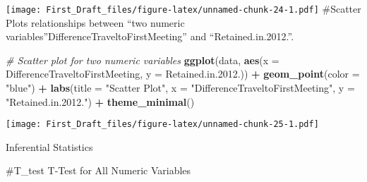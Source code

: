 \documentclass[
]{article}
\newenvironment{Shaded}{\begin{snugshade}}{\end{snugshade}}
\newcommand{\AttributeTok}[1]{\textcolor[rgb]{0.13,0.29,0.53}{#1}}
\newcommand{\CommentTok}[1]{\textcolor[rgb]{0.56,0.35,0.01}{\textit{#1}}}
\newcommand{\FloatTok}[1]{\textcolor[rgb]{0.00,0.00,0.81}{#1}}
\newcommand{\FunctionTok}[1]{\textcolor[rgb]{0.13,0.29,0.53}{\textbf{#1}}}
\newcommand{\NormalTok}[1]{#1}
\newcommand{\SpecialCharTok}[1]{\textcolor[rgb]{0.81,0.36,0.00}{\textbf{#1}}}
\newcommand{\StringTok}[1]{\textcolor[rgb]{0.31,0.60,0.02}{#1}}
\begin{document}
\texttt{[image: First\_Draft\_files/figure-latex/unnamed-chunk-24-1.pdf]}
\#Scatter Plots relationships between ``two numeric
variables''DifferenceTraveltoFirstMeeting'' and ``Retained.in.2012.''.

\begin{Shaded}
\begin{Highlighting}[]
\CommentTok{\# Scatter plot for two numeric variables}
\FunctionTok{ggplot}\NormalTok{(data, }\FunctionTok{aes}\NormalTok{(}\AttributeTok{x =}\NormalTok{ DifferenceTraveltoFirstMeeting, }\AttributeTok{y =}\NormalTok{ Retained.in.}\FloatTok{2012.}\NormalTok{)) }\SpecialCharTok{+}
  \FunctionTok{geom\_point}\NormalTok{(}\AttributeTok{color =} \StringTok{"blue"}\NormalTok{) }\SpecialCharTok{+}
  \FunctionTok{labs}\NormalTok{(}\AttributeTok{title =} \StringTok{"Scatter Plot"}\NormalTok{, }\AttributeTok{x =} \StringTok{"DifferenceTraveltoFirstMeeting"}\NormalTok{, }\AttributeTok{y =} \StringTok{"Retained.in.2012."}\NormalTok{) }\SpecialCharTok{+}
  \FunctionTok{theme\_minimal}\NormalTok{()}
\end{Highlighting}
\end{Shaded}

\texttt{[image: First\_Draft\_files/figure-latex/unnamed-chunk-25-1.pdf]}

Inferential Statistics

\#T\_test T-Test for All Numeric Variables
\end{document}
